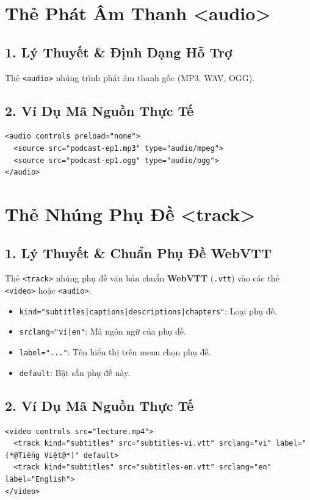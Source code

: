 \documentclass[11pt,oneside]{book}
\newcommand{\codeinline}[1]{\textcolor{accentOrange}{\texttt{#1}}}
\begin{document}
\section{Thẻ Phát Âm Thanh <audio>}
\subsection{1. Lý Thuyết \& Định Dạng Hỗ Trợ}
Thẻ \codeinline{<audio>} nhúng trình phát âm thanh gốc (MP3, WAV, OGG).

\subsection{2. Ví Dụ Mã Nguồn Thực Tế}
\begin{lstlisting}[language=HTML5, caption={Ví dụ thẻ audio phát nhạc podcast}]
<audio controls preload="none">
  <source src="podcast-ep1.mp3" type="audio/mpeg">
  <source src="podcast-ep1.ogg" type="audio/ogg">
</audio>
\end{lstlisting}

\section{Thẻ Nhúng Phụ Đề <track>}
\subsection{1. Lý Thuyết \& Chuẩn Phụ Đề WebVTT}
Thẻ \codeinline{<track>} nhúng phụ đề văn bản chuẩn \textbf{WebVTT} (\codeinline{.vtt}) vào các thẻ \codeinline{<video>} hoặc \codeinline{<audio>}.

\begin{itemize}
    \item \codeinline{kind="subtitles|captions|descriptions|chapters"}: Loại phụ đề.
    \item \codeinline{srclang="vi|en"}: Mã ngôn ngữ của phụ đề.
    \item \codeinline{label="..."}: Tên hiển thị trên menu chọn phụ đề.
    \item \codeinline{default}: Bật sẵn phụ đề này.
\end{itemize}

\subsection{2. Ví Dụ Mã Nguồn Thực Tế}
\begin{lstlisting}[language=HTML5, caption={Ví dụ nhúng phụ đề tiếng Việt và tiếng Anh cho video}]
<video controls src="lecture.mp4">
  <track kind="subtitles" src="subtitles-vi.vtt" srclang="vi" label="(*@Tiếng Việt@*)" default>
  <track kind="subtitles" src="subtitles-en.vtt" srclang="en" label="English">
</video>
\end{lstlisting}
\end{document}
